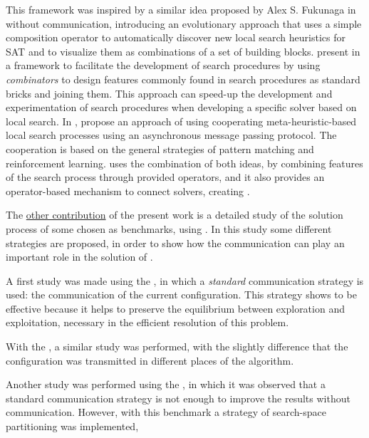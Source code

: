 This framework was inspired by a similar idea proposed by Alex S. Fukunaga in \cite{Fukunaga2008} without communication, introducing an evolutionary approach that uses a simple composition operator to automatically discover new local search heuristics for SAT and to  visualize them as combinations of a set of building blocks.  present in \cite{Landtsheer2015} a framework to facilitate the development of search procedures by using \textit{combinators} to design features commonly found in search procedures as standard bricks and joining them. This approach can speed-up the development and experimentation of search procedures when developing a specific solver based on local search. In \cite{Martin2016},  propose an approach of using cooperating meta-heuristic-based local search processes using an asynchronous message passing protocol. The cooperation is based on the general strategies of pattern matching and reinforcement learning. \posl{} uses the combination of both ideas, by combining features of the search process through provided operators, and it also provides an operator-based mechanism to connect solvers, creating \comstrs.


The \underline{other contribution} of the present work is a detailed study of the solution process of some \CSPs{} chosen as benchmarks, using \posl{}. In this study some different strategies are proposed, in order to show how the communication can play an important role in the solution of \csps{}.

A first study was made using the \sgp{}, in which a \textit{standard} communication strategy is used: the communication of the current configuration. This strategy shows to be effective because it helps to preserve the equilibrium between exploration and exploitation, necessary in the efficient resolution of this problem.

With the \carrp{}, a similar study was performed, with the slightly difference that the configuration was transmitted in different places of the algorithm.

Another study was performed using the \nqp{}, in which it was observed that a standard communication strategy is not enough to improve the results without communication. However, with this benchmark a strategy of search-space partitioning was implemented, 

